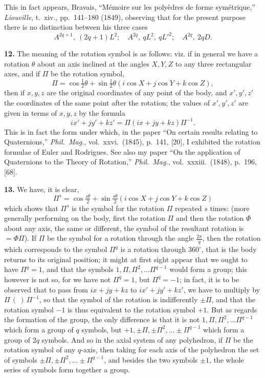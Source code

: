 \documentclass[11pt]{article}
\begin{document}
This in fact appears, Bravais, ``M\'emoire sur les poly\`edres de forme sym\'etrique,'' \emph{Liouville}, t.~xiv., pp.~141--180 (1849), observing that for the present purpose there is no distinction between his three cases
\[ A^{2q+1},\ (2q+1)L^2;\quad A^{2q},\ qL^2,\ qL'^2;\quad A^{2q},\ 2qD. \]

\textbf{12.} The meaning of the rotation symbol is as follows: viz. if in general we have a rotation $\theta$ about an axis inclined at the angles $X, Y, Z$ to any three rectangular axes, and if $\Pi$ be the rotation symbol,
\[ \Pi = \cos\tfrac{1}{2}\theta + \sin\tfrac{1}{2}\theta(i\cos X + j\cos Y + k\cos Z), \]
then if $x, y, z$ are the original coordinates of any point of the body, and $x', y', z'$ the coordinates of the same point after the rotation; the values of $x', y', z'$ are given in terms of $x, y, z$ by the formula
\[ i x' + j y' + k z' = \Pi(i x + j y + k z)\Pi^{-1}. \]
This is in fact the form under which, in the paper ``On certain results relating to Quaternions,'' \emph{Phil.~Mag.}, vol.~xxvi.~(1845), p.~141, [20], I exhibited the rotation formulae of Euler and Rodrigues. See also my paper ``On the application of Quaternions to the Theory of Rotation,'' \emph{Phil.~Mag.}, vol.~xxxiii.~(1848), p.~196, [68].

\textbf{13.} We have, it is clear,
\[ \Pi^s = \cos\tfrac{s\theta}{2} + \sin\tfrac{s\theta}{2}(i\cos X + j\cos Y + k\cos Z) \]
which shows that $\Pi^s$ is the symbol for the rotation $\Pi$ repeated $s$ times: (more generally performing on the body, first the rotation $\Pi$ and then the rotation $\Phi$ about any axis, the same or different, the symbol of the resultant rotation is $= \Phi\Pi$). If $\Pi$ be the symbol for a rotation through the angle $\tfrac{2\pi}{q}$, then the rotation which corresponds to the symbol $\Pi^q$ is a rotation through $360^\circ$, that is the body returns to its original position; it might at first sight appear that we ought to have $\Pi^q = 1$, and that the symbols $1, \Pi, \Pi^2, \ldots \Pi^{q-1}$ would form a group; this however is not so, for we have not $\Pi^q = 1$, but $\Pi^q = -1$; in fact, it is to be observed that to pass from $ix + jy + kz$ to $ix' + jy' + kz'$, we have to multiply by $\Pi\,(\ )\,\Pi^{-1}$, so that the symbol of the rotation is indifferently $\pm\Pi$, and that the rotation symbol $-1$ is thus equivalent to the rotation symbol $+1$. But as regards the formation of the group, the only difference is that it is not $1, \Pi, \Pi^2, \ldots \Pi^{q-1}$ which form a group of $q$ symbols, but $+1, \pm\Pi, \pm\Pi^2, \ldots \pm\Pi^{q-1}$ which form a group of $2q$ symbols. And so in the axial system of any polyhedron, if $\Pi$ be the rotation symbol of any $q$-axis, then taking for each axis of the polyhedron the set of symbols $\pm\Pi, \pm\Pi^2, \ldots \pm\Pi^{q-1}$, and besides the two symbols $\pm 1$, the whole series of symbols form together a group.
\end{document}
